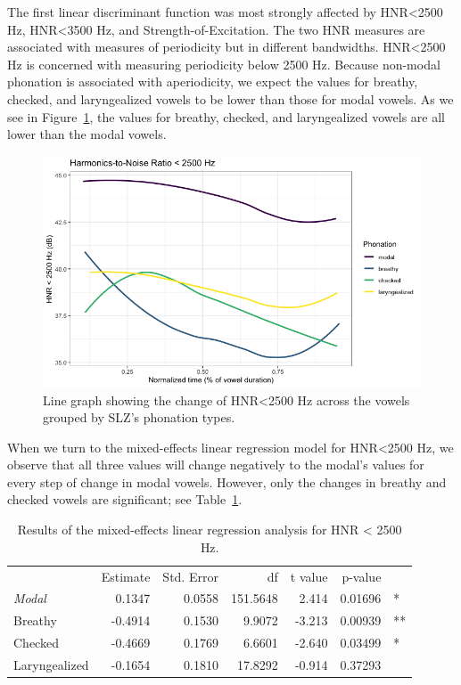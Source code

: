 \documentclass[12pt, letterpaper]{article}
\providecommand{\lsptoprule}{\midrule\toprule}
\providecommand{\lspbottomrule}{\bottomrule\midrule}
\begin{document}
The first linear discriminant function was most strongly affected by HNR\textless 2500 Hz, HNR\textless 3500 Hz, and Strength-of-Excitation. The two HNR measures are associated with measures of periodicity but in different bandwidths. HNR\textless 2500 Hz is concerned with measuring periodicity below 2500 Hz. Because non-modal phonation is associated with aperiodicity, we expect the values for breathy, checked, and laryngealized vowels to be lower than those for modal vowels. As we see in Figure~\ref*{fig:HNR25}, the values for breathy, checked, and laryngealized vowels are all lower than the modal vowels. 
\begin{figure}[!h]
	\centering
	\includegraphics[width=.75\linewidth]{Images/HNR25.png}
	\caption{Line graph showing the change of HNR\textless 2500 Hz across the vowels grouped by SLZ's phonation types.}
	\label{fig:HNR25}
\end{figure}

When we turn to the mixed-effects linear regression model for HNR<2500 Hz, we observe that all three values will change negatively to the modal's values for every step of change in modal vowels. However, only the changes in breathy and checked vowels are significant; see Table~\ref*{tab:HNR25}.
\begin{table}[!h]
    \centering
    \caption{Results of the mixed-effects linear regression analysis for HNR < 2500 Hz.}
    \label{tab:HNR25}
    \begin{tabular}{lrrrrrl}
	\lsptoprule
					&  Estimate  & Std. Error & df & t value & p-value & \\
        \textit{Modal}  &  0.1347	& 0.0558 & 151.5648 &  2.414 & 0.01696 & * \\  
  	Breathy   		&  -0.4914 	& 0.1530 &  9.9072  & -3.213 & 0.00939 & ** \\
	Checked    		&  -0.4669  & 0.1769 &  6.6601  & -2.640 & 0.03499 & * \\
	Laryngealized	&  -0.1654  & 0.1810 & 17.8292  & -0.914 & 0.37293 & \\
    \lspbottomrule
    \end{tabular}
\end{table}
\end{document}
